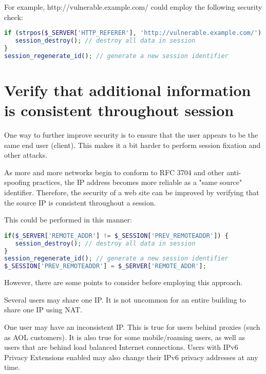 For example, http://vulnerable.example.com/ could employ the following security check:

\begin{lstlisting}[language=PHP]
if (strpos($_SERVER['HTTP_REFERER'], 'http://vulnerable.example.com/') !== 0) {
   session_destroy(); // destroy all data in session
}
session_regenerate_id(); // generate a new session identifier
\end{lstlisting}



\section{Verify that additional information is consistent throughout session}

One way to further improve security is to ensure that the user appears to be the same end user (client). This makes it a bit harder to perform session fixation and other attacks.

As more and more networks begin to conform to RFC 3704 and other anti-spoofing practices, the IP address becomes more reliable as a "same source" identifier. Therefore, the security of a web site can be improved by verifying that the source IP is consistent throughout a session.

This could be performed in this manner:

\begin{lstlisting}[language=PHP]
if($_SERVER['REMOTE_ADDR'] != $_SESSION['PREV_REMOTEADDR']) {
   session_destroy(); // destroy all data in session
}
session_regenerate_id(); // generate a new session identifier
$_SESSION['PREV_REMOTEADDR'] = $_SERVER['REMOTE_ADDR'];
\end{lstlisting}

However, there are some points to consider before employing this approach.

\begin{compactitem}
\item Several users may share one IP. It is not uncommon for an entire building to share one IP using NAT.
\item One user may have an inconsistent IP. This is true for users behind proxies (such as AOL customers). It is also true for some mobile/roaming users, as well as users that are behind load balanced Internet connections. Users with IPv6 Privacy Extensions enabled may also change their IPv6 privacy addresses at any time.

\end{compactitem}

